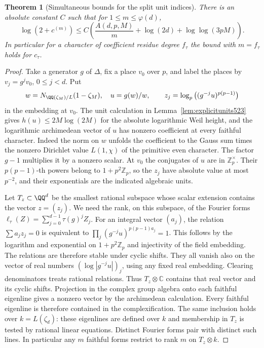\documentclass[a4paper,11pt]{article}
\newtheorem{theorem}[proposition]{Theorem}
\theoremstyle{definition}
\theoremstyle{remark}
\newcommand{\ZZ}{\mathbb Z}\newcommand{\ord}{\operatorname{ord}}
\numberwithin{equation}{section}
\begin{document}
\begin{theorem}[Simultaneous bounds for the split unit indices]
\leavevmode\label{thm:quantlog646}
There is an absolute constant \(C\) such that for
\(1\le m\le\varphi(d)\),
\[
 \log(2+c^{(m)})\le C\left(
       \frac{A(d,p,M)}{m}+\log(2d)+\log\log(3pM)\right).
\]
In particular for a character of coefficient residue degree
\(f_\tau\) the bound with \(m=f_\tau\) holds for \(c_\tau\).
\end{theorem}
\begin{proof}
Take a generator \(g\) of \(\Delta\), fix a place \(v_0\) over
\(p\), and label the places by \(v_j=g^jv_0\), \(0\le j<d\).
Put
\[
 w=N_{\QQ(\zeta_M)/L}(1-\zeta_M),\quad
 u=g(w)/w,\qquad
 z_j=\log_p\big((g^{-j}u)^{p(p-1)}\big)
\]
in the embedding at \(v_0\). The unit calculation in
Lemma~\ref{lem:explicitunits523} gives
\(h(u)\le2M\log(2M)\) for the absolute logarithmic Weil
height, and the logarithmic archimedean vector of \(u\)
has nonzero coefficient at every faithful character. Indeed
the norm on \(w\) unfolds the coefficient to the Gauss sum
times the nonzero Dirichlet value \(L(1,\chi)\) of the
primitive even character. The factor \(g-1\) multiplies it
by a nonzero scalar. At \(v_0\) the conjugates of \(u\)
are in \(\ZZ_p^\times\). Their \(p(p-1)\)-th powers belong
to \(1+p^2\ZZ_p\), so the \(z_j\) have absolute value at
most \(p^{-2}\), and their exponentials are the indicated
algebraic units.

Let \(T_z\subset\QQ^d\) be the smallest rational subspace
whose scalar extension contains the vector \(z=(z_j)\).
We need the rank, on this subspace, of the Fourier forms
\(\ell_\tau(Z)=\sum_{j=0}^{d-1}\tau(g)^jZ_j\).
For an integral vector \((a_j)\), the relation
\(\sum a_jz_j=0\) is equivalent to
\(\prod_j(g^{-j}u)^{p(p-1)a_j}=1\). This follows by the
logarithm and exponential on \(1+p^2\ZZ_p\) and injectivity
of the field embedding. The relations are therefore stable
under cyclic shifts. They all vanish also on the vector of
real numbers \((\log|g^{-j}u|)_j\), using any fixed real
embedding. Clearing denominators treats rational relations.
Thus \(T_z\otimes\mathbb C\) contains that real vector and
its cyclic shifts. Projection in the complex group algebra
onto each faithful eigenline gives a nonzero vector by the
archimedean calculation. Every faithful eigenline is therefore
contained in the complexification. The same inclusion holds
over \(k=L(\zeta_d)\): these eigenlines are defined over \(k\)
and membership in \(T_z\) is tested by rational linear
equations. Distinct Fourier forms pair with distinct such
lines. In particular any \(m\) faithful forms restrict to
rank \(m\) on \(T_z\otimes k\).


\end{proof}
\end{document}
